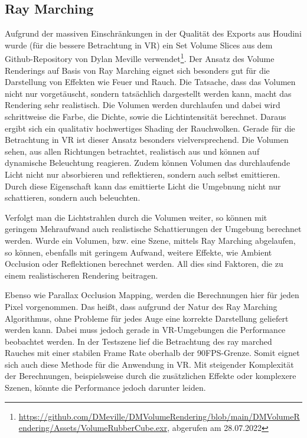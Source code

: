 \subsection{Ray Marching}
\label{sec:5.2}

Aufgrund der massiven Einschränkungen in der Qualität des Exports aus Houdini wurde (für die bessere Betrachtung in VR) ein Set Volume Slices aus dem 
Github-Repository von Dylan Meville verwendet\footnote{\url{https://github.com/DMeville/DMVolumeRendering/blob/main/DMVolumeRendering/Assets/VolumeRubberCube.exr}, abgerufen am 28.07.2022}.
Der Ansatz des Volume Renderings auf Basis von Ray Marching eignet sich besonders gut für die Darstellung von Effekten wie Feuer und Rauch. 
Die Tatsache, dass das Volumen nicht nur vorgetäuscht, sondern tatsächlich dargestellt werden kann, macht das Rendering sehr realistisch. 
Die Volumen werden durchlaufen und dabei wird schrittweise die Farbe, die Dichte, sowie die Lichtintensität berechnet. 
Daraus ergibt sich ein qualitativ hochwertiges Shading der Rauchwolken. Gerade für die Betrachtung in VR ist dieser Ansatz besonders vielversprechend. 
Die Volumen sehen, aus allen Richtungen betrachtet, realistisch aus und können auf dynamische Beleuchtung reagieren. 
Zudem können Volumen das durchlaufende Licht nicht nur absorbieren und reflektieren, sondern auch selbst emittieren. Durch diese Eigenschaft kann das
emittierte Licht die Umgebnung nicht nur schattieren, sondern auch beleuchten. 

Verfolgt man die Lichtstrahlen durch die Volumen weiter, so können mit geringem Mehraufwand auch realistische Schattierungen der Umgebung berechnet werden. 
Wurde ein Volumen, bzw. eine Szene, mittels Ray Marching abgelaufen, so können, ebenfalls mit geringem Aufwand, weitere Effekte, wie 
Ambient Occlusion oder Reflektionen berechnet werden. All dies sind Faktoren, die zu einem realistischeren Rendering beitragen.

Ebenso wie Parallax Occlusion Mapping, werden die Berechnungen hier für jeden Pixel vorgenommen.
Das heißt, dass aufgrund der Natur des Ray Marching Algorithmus, ohne Probleme für jedes Auge eine korrekte Darstellung geliefert werden kann. 
Dabei muss jedoch gerade in VR-Umgebungen die Performance beobachtet werden. 
In der Testszene lief die Betrachtung des ray marched Rauches mit einer stabilen Frame Rate oberhalb der 90FPS-Grenze. 
Somit eignet sich auch diese Methode für die Anwendung in VR. Mit steigender Komplexität der Berechnungen, beispielsweise durch die zusätzlichen Effekte
oder komplexere Szenen, könnte die Performance jedoch darunter leiden. 

